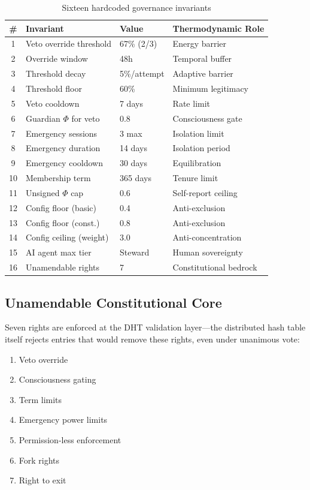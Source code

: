 \documentclass[11pt,a4paper]{article}
\begin{document}
\begin{table}[h]
\centering
\caption{Sixteen hardcoded governance invariants}
\label{tab:invariants}
\small
\begin{tabular}{clll}
\toprule
\textbf{\#} & \textbf{Invariant} & \textbf{Value} & \textbf{Thermodynamic Role} \\
\midrule
1 & Veto override threshold & 67\% (2/3) & Energy barrier \\
2 & Override window & 48h & Temporal buffer \\
3 & Threshold decay & 5\%/attempt & Adaptive barrier \\
4 & Threshold floor & 60\% & Minimum legitimacy \\
5 & Veto cooldown & 7 days & Rate limit \\
6 & Guardian $\Phi$ for veto & 0.8 & Consciousness gate \\
7 & Emergency sessions & 3 max & Isolation limit \\
8 & Emergency duration & 14 days & Isolation period \\
9 & Emergency cooldown & 30 days & Equilibration \\
10 & Membership term & 365 days & Tenure limit \\
11 & Unsigned $\Phi$ cap & 0.6 & Self-report ceiling \\
12 & Config floor (basic) & 0.4 & Anti-exclusion \\
13 & Config floor (const.) & 0.8 & Anti-exclusion \\
14 & Config ceiling (weight) & 3.0 & Anti-concentration \\
15 & AI agent max tier & Steward & Human sovereignty \\
16 & Unamendable rights & 7 & Constitutional bedrock \\
\bottomrule
\end{tabular}
\end{table}

\subsection{Unamendable Constitutional Core}

Seven rights are enforced at the DHT validation layer---the distributed hash table itself rejects entries that would remove these rights, even under unanimous vote:

\begin{enumerate}
    \item Veto override
    \item Consciousness gating
    \item Term limits
    \item Emergency power limits
    \item Permission-less enforcement
    \item Fork rights
    \item Right to exit
\end{enumerate}
\end{document}
